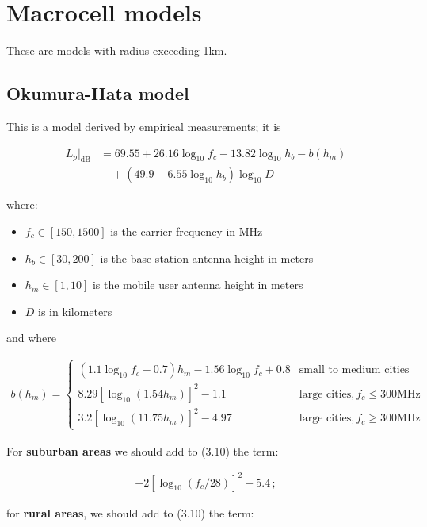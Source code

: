 \documentclass[a4paper, 12pt]{book}
\begin{document}
\section{Macrocell models}

These are models with radius exceeding 1km.

\subsection{Okumura-Hata model}

This is a model derived by empirical measurements; it is

\begin{align}
L_p|_{\text{dB}} &= 69.55 + 26.16 \log_{10} f_c - 13.82 \log_{10} h_b - b(h_m) \nonumber \\
&\quad + (49.9 - 6.55 \log_{10} h_b) \log_{10} D \tag{3.10}
\end{align}

where:

\begin{itemize}
    \item $f_c \in [150, 1500]$ is the carrier frequency in MHz
    \item $h_b \in [30, 200]$ is the base station antenna height in meters
    \item $h_m \in [1, 10]$ is the mobile user antenna height in meters
    \item $D$ is in kilometers
\end{itemize}

and where

\begin{align}
b(h_m) = \begin{cases}
(1.1 \log_{10} f_c - 0.7)h_m - 1.56 \log_{10} f_c + 0.8 & \text{small to medium cities} \\
8.29 [\log_{10}(1.54 h_m)]^2 - 1.1 & \text{large cities}, f_c \le 300\text{MHz} \\
3.2 [\log_{10}(11.75 h_m)]^2 - 4.97 & \text{large cities}, f_c \ge 300\text{MHz}
\end{cases} \tag{3.11}
\end{align}

For \textbf{suburban areas} we should add to (3.10) the term:

\begin{align}
-2[\log_{10}(f_c/28)]^2 - 5.4 \,; \tag{3.12}
\end{align}

for \textbf{rural areas}, we should add to (3.10) the term:
\end{document}

